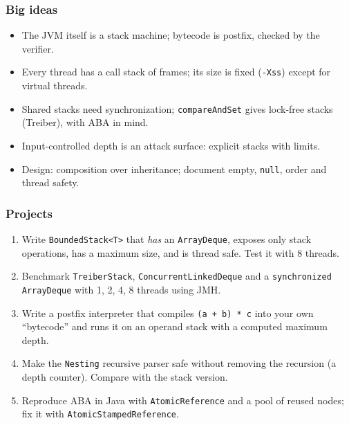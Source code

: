 \documentclass[aspectratio=169,10pt,compress]{beamer}
\begin{document}
\begin{frame}[t,fragile] \frametitle{Big ideas}
  \begin{itemize}
    \item The JVM itself is a stack machine; bytecode is postfix, checked by the verifier.
    \item Every thread has a call stack of frames; its size is fixed (\texttt{-Xss}) except for virtual threads.
    \item Shared stacks need synchronization; \texttt{compareAndSet} gives lock-free stacks (Treiber), with ABA in mind.
    \item Input-controlled depth is an attack surface: explicit stacks with limits.
    \item Design: composition over inheritance; document empty, \texttt{null}, order and thread safety.
  \end{itemize}
\end{frame}




\begin{frame}[t,fragile] \frametitle{Projects}
  \begin{enumerate}\small
    \item Write \texttt{BoundedStack<T>} that \emph{has} an \texttt{ArrayDeque}, exposes only stack operations, has a maximum size, and is thread safe. Test it with 8 threads.
    \item Benchmark \texttt{TreiberStack}, \texttt{ConcurrentLinkedDeque} and a \texttt{synchronized} \texttt{ArrayDeque} with 1, 2, 4, 8 threads using JMH.
    \item Write a postfix interpreter that compiles \texttt{(a + b) * c} into your own ``bytecode'' and runs it on an operand stack with a computed maximum depth.
    \item Make the \texttt{Nesting} recursive parser safe without removing the recursion (a depth counter). Compare with the stack version.
    \item Reproduce ABA in Java with \texttt{AtomicReference} and a pool of reused nodes; fix it with \texttt{AtomicStampedReference}.
  \end{enumerate}
\end{frame}




\begin{frame}[t,fragile]
	\begin{center}
		\vspace{4cm}
	\end{center}
\end{frame}
\end{document}
